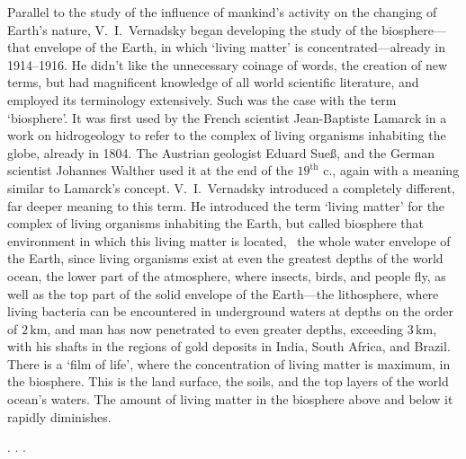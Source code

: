 Parallel to the study of the influence of mankind's activity on the changing of
Earth's nature, V.~I.\ Vernadsky began developing the study of the
biosphere---that envelope of the Earth, in which `living matter' is
concentrated---already in 1914--1916.  He didn't like the unnecessary coinage
of words, the creation of new terms, but had magnificent knowledge of all world
scientific literature, and employed its terminology extensively.  Such was the
case with the term `biosphere'.  It was first used by the French scientist
Jean-Baptiste Lamarck in a work on hidrogeology to refer to the complex of living organisms
inhabiting the globe, already in 1804.  The Austrian geologist Eduard Sueß, and the German
scientist Johannes Walther used it at the end of the
$19^\mathrm{th}$ c., again with a meaning similar to Lamarck's concept.  V.~I.\ 
Vernadsky introduced a completely different, far deeper meaning to this term.
He introduced the term `living matter' for the complex of living organisms
inhabiting the Earth, but called biosphere that environment in which this
living matter is located, \ie\ the whole water envelope of the Earth, since
living organisms exist at even the greatest depths of the world ocean, the
lower part of the atmosphere, where insects, birds, and people fly, as well as
the top part of the solid envelope of the Earth---the lithosphere, where living
bacteria can be encountered in underground waters at depths on the order of
$2\,\mathrm{km}$, and man has now penetrated to even greater depths, exceeding
$3\,\mathrm{km}$, with his shafts in the regions of gold deposits in India,
South Africa, and Brazil.  There is a `film of life',
where the concentration of living matter is maximum, in the biosphere.  This is
the land surface, the soils, and the top layers of the world ocean's waters.
The amount of living matter in the biosphere above and below it rapidly
diminishes.

. . .
